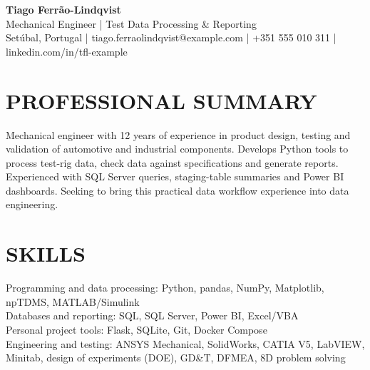 \documentclass[11pt,a4paper]{article}
\begin{document}
\begin{center}
{\Huge\bfseries\color{primarycolor} Tiago Ferrão-Lindqvist}\\[0.35em]
{\large\color{accentcolor} Mechanical Engineer | Test Data Processing \& Reporting}\\[0.25em]
{\small Setúbal, Portugal | tiago.ferraolindqvist@example.com | +351 555 010 311 | linkedin.com/in/tfl-example}
\end{center}

\section*{PROFESSIONAL SUMMARY}
Mechanical engineer with 12 years of experience in product design, testing and validation of automotive and industrial components. Develops Python tools to process test-rig data, check data against specifications and generate reports. Experienced with SQL Server queries, staging-table summaries and Power BI dashboards. Seeking to bring this practical data workflow experience into data engineering.

\section*{SKILLS}
Programming and data processing: Python, pandas, NumPy, Matplotlib, npTDMS, MATLAB/Simulink\\
Databases and reporting: SQL, SQL Server, Power BI, Excel/VBA\\
Personal project tools: Flask, SQLite, Git, Docker Compose\\
Engineering and testing: ANSYS Mechanical, SolidWorks, CATIA V5, LabVIEW, Minitab, design of experiments (DOE), GD\&T, DFMEA, 8D problem solving
\end{document}
